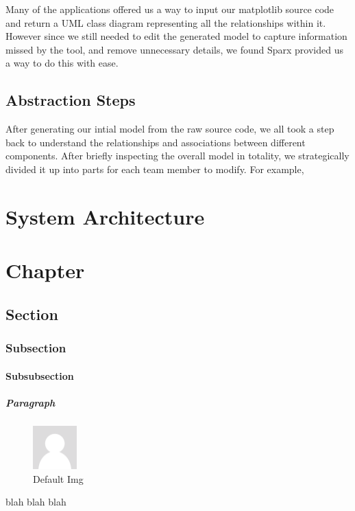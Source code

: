 \documentclass[pdftex,10pt,a4paper]{report}
\begin{document}
Many of the applications offered us a way to input our matplotlib source code and return a UML class diagram representing all the relationships within it. However since we still needed to edit the generated model to capture information missed by the tool, and remove unnecessary details, we found Sparx provided us a way to do this with ease.


\section{Abstraction Steps}

After generating our intial model from the raw source code, we all took a step back to understand the relationships and associations between different components. After briefly inspecting the overall model in totality, we strategically divided it up into parts for each team member to modify. For example, 



\chapter{System Architecture}


\chapter{Chapter}
\section{Section}
\subsection{Subsection}
\subsubsection{Subsubsection}
\paragraph{Paragraph}

\begin{figure}[ht!]
\centering
\includegraphics[width=0.15\textwidth]{default}
\caption[]{Default Img}
\label{fig:overflow}
\end{figure}

blah blah blah





\end{document}
